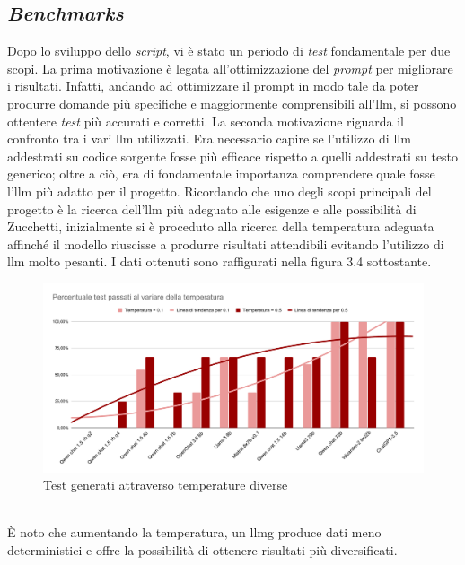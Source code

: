     \subsection{\textit{Benchmarks}}
    Dopo lo sviluppo dello \textit{script}, vi è stato un periodo di \textit{test} fondamentale per due scopi. La prima motivazione è legata all'ottimizzazione del \textit{prompt} per migliorare i risultati.  Infatti, andando ad ottimizzare il prompt in modo tale da poter produrre domande più specifiche e maggiormente comprensibili all'\gls{llm},  si possono ottentere \textit{test} più accurati e corretti. 
    La seconda motivazione riguarda il confronto tra i vari \gls{llm} utilizzati.
    Era necessario capire se l'utilizzo di \gls{llm} addestrati su codice sorgente fosse più efficace rispetto a quelli addestrati su testo generico; oltre a ciò, era di fondamentale importanza comprendere quale fosse l'\gls{llm} più adatto per il progetto.
    Ricordando che uno degli scopi principali del progetto è la ricerca dell’\gls{llm} più adeguato alle esigenze e alle possibilità di Zucchetti, 
    inizialmente si è proceduto alla ricerca della temperatura adeguata affinché il modello riuscisse a produrre risultati attendibili evitando 
    l’utilizzo di \gls{llm} molto pesanti. I dati ottenuti sono raffigurati nella figura 3.4 sottostante.\newpage
    \begin{figure}[!h]
        \centering        
        \includegraphics[width=14.5cm]{img/Percentuale test passati al variare della temperatura.pdf}
        \caption{Test generati attraverso temperature diverse}
    \end{figure}
    \\È noto che aumentando la temperatura, un \gls{llmg} produce dati meno deterministici e offre la possibilità di ottenere risultati più diversificati.
